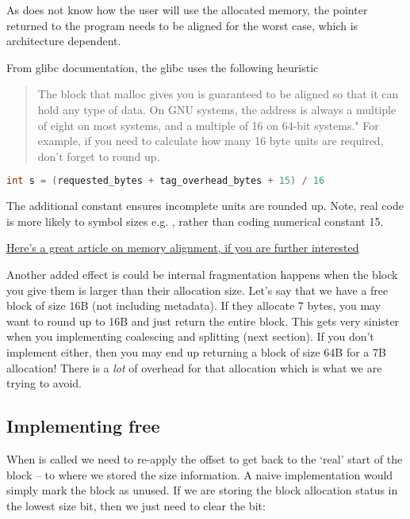 As  does not know how the user will use the allocated memory, the pointer returned to the program needs to be aligned for the worst case, which is architecture dependent.

From glibc documentation, the glibc  uses the following heuristic
\begin{quote}
The block that malloc gives you is guaranteed to be aligned so that it can hold any type of data. On GNU systems, the address is always a multiple of eight on most systems, and a multiple of 16 on 64-bit systems." For example, if you need to calculate how many 16 byte units are required, don't forget to round up.
\end{quote}

\begin{lstlisting}[language=C]
int s = (requested_bytes + tag_overhead_bytes + 15) / 16
\end{lstlisting}

The additional constant ensures incomplete units are rounded up. Note, real code is more likely to symbol sizes e.g. , rather than coding numerical constant 15.

\href{http://www.ibm.com/developerworks/library/pa-dalign/}{Here's a great article on memory alignment, if you are further interested}

Another added effect is could be internal fragmentation happens when the block you give them is larger than their allocation size.
Let's say that we have a free block of size 16B (not including metadata).
If they allocate 7 bytes, you may want to round up to 16B and just return the entire block.
This gets very sinister when you implementing coalescing and splitting (next section).
If you don't implement either, then you may end up returning a block of size 64B for a 7B allocation!
There is a \emph{lot} of overhead for that allocation which is what we are trying to avoid.

\subsection{Implementing free}

When  is called we need to re-apply the offset to get back to the `real' start of the block -- to where we stored the size information.
A naive implementation would simply mark the block as unused. If we are storing the block allocation status in the lowest size bit, then we just need to clear the bit:

